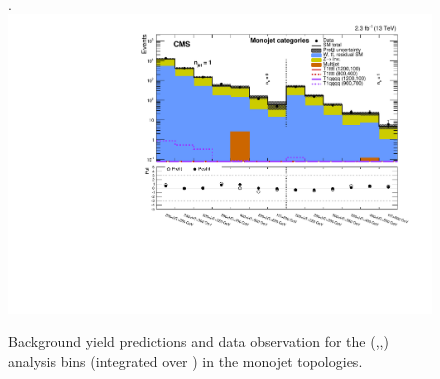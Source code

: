 \begin{figure}[tbhp]
\begin{center}
     \\
  \end{center}
\end{figure}


\clearpage

\clearpage

\clearpage


\clearpage

\clearpage

\clearpage





\clearpage
\begin{landscape}
  \begin{center}
    \begin{figure}[h!]
      \caption{Background yield predictions and data observation for the (\njet,\nb,\scalht) analysis bins (integrated over \MHT) in the monojet topologies. \label{fig:summaryPlot_Monojet}}.
      \includegraphics[width=0.8\linewidth]{figures/postFitResults/summaryPlots/summaryPlot_Monojet_prefit_overlay_fit_b}
    \end{figure}
  \end{center}
\end{landscape}

